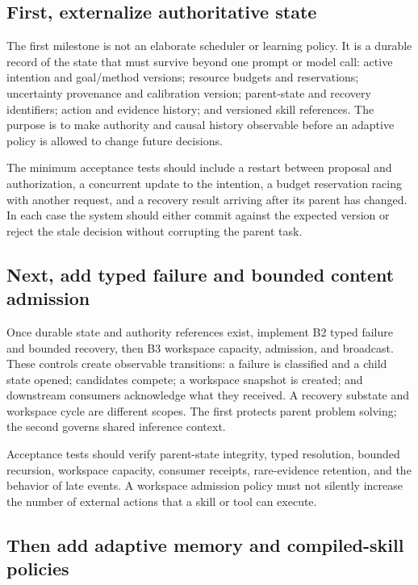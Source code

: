 \subsection{First, externalize authoritative state}
\label{subsec:ch18-externalize-state}

The first milestone is not an elaborate scheduler or learning policy. It is a durable record of the state that must survive beyond one prompt or model call: active intention and goal/method versions; resource budgets and reservations; uncertainty provenance and calibration version; parent-state and recovery identifiers; action and evidence history; and versioned skill references. The purpose is to make authority and causal history observable before an adaptive policy is allowed to change future decisions.

The minimum acceptance tests should include a restart between proposal and authorization, a concurrent update to the intention, a budget reservation racing with another request, and a recovery result arriving after its parent has changed. In each case the system should either commit against the expected version or reject the stale decision without corrupting the parent task.

\subsection{Next, add typed failure and bounded content admission}
\label{subsec:ch18-typed-failure-and-workspace}

Once durable state and authority references exist, implement B2 typed failure and bounded recovery, then B3 workspace capacity, admission, and broadcast. These controls create observable transitions: a failure is classified and a child state opened; candidates compete; a workspace snapshot is created; and downstream consumers acknowledge what they received. A recovery substate and workspace cycle are different scopes. The first protects parent problem solving; the second governs shared inference context.

Acceptance tests should verify parent-state integrity, typed resolution, bounded recursion, workspace capacity, consumer receipts, rare-evidence retention, and the behavior of late events. A workspace admission policy must not silently increase the number of external actions that a skill or tool can execute.

\subsection{Then add adaptive memory and compiled-skill policies}
\label{subsec:ch18-adaptive-memory-and-skills}

